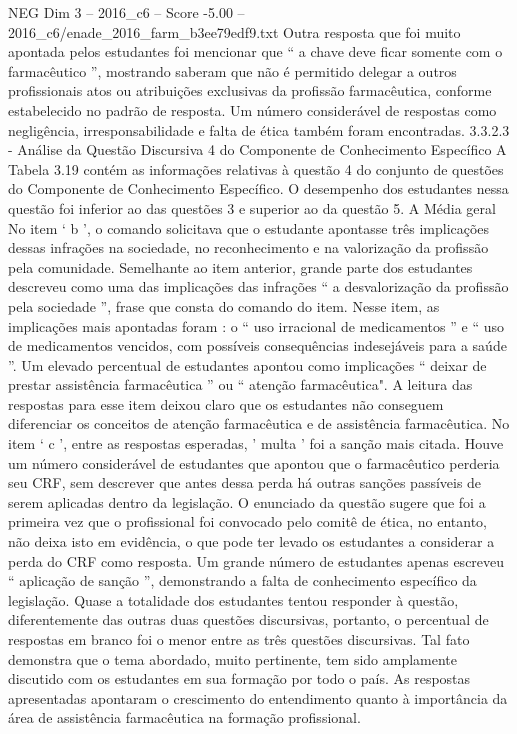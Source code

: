 \begin{textsample}{NEG Dim 3 – 2016\_c6 – Score -5.00 – 2016\_c6/enade\_2016\_farm\_b3ee79edf9.txt}
Outra resposta que foi muito apontada pelos estudantes foi mencionar que “ a chave deve ficar somente com o farmacêutico ”, mostrando saberam que não é permitido delegar a outros profissionais atos ou atribuições exclusivas da profissão farmacêutica, conforme estabelecido no padrão de resposta.
Um número considerável de respostas como negligência, irresponsabilidade e falta de ética também foram encontradas. 3.3.2.3 - Análise da Questão Discursiva 4 do Componente de Conhecimento Específico A Tabela 3.19 contém as informações relativas à questão 4 do conjunto de questões do Componente de Conhecimento Específico.
O desempenho dos estudantes nessa questão foi inferior ao das questões 3 e superior ao da questão 5.
A Média geral No item ‘ b ’, o comando solicitava que o estudante apontasse três implicações dessas infrações na sociedade, no reconhecimento e na valorização da profissão pela comunidade.
Semelhante ao item anterior, grande parte dos estudantes descreveu como uma das implicações das infrações “ a desvalorização da profissão pela sociedade ”, frase que consta do comando do item.
Nesse item, as implicações mais apontadas foram : o “ uso irracional de medicamentos ” e “ uso de medicamentos vencidos, com possíveis consequências indesejáveis para a saúde ”.
Um elevado percentual de estudantes apontou como implicações “ deixar de prestar assistência farmacêutica ” ou “ atenção farmacêutica".
A leitura das respostas para esse item deixou claro que os estudantes não conseguem diferenciar os conceitos de atenção farmacêutica e de assistência farmacêutica.
No item ‘ c ’, entre as respostas esperadas, ' multa ' foi a sanção mais citada.
Houve um número considerável de estudantes que apontou que o farmacêutico perderia seu CRF, sem descrever que antes dessa perda há outras sanções passíveis de serem aplicadas dentro da legislação.
O enunciado da questão sugere que foi a primeira vez que o profissional foi convocado pelo comitê de ética, no entanto, não deixa isto em evidência, o que pode ter levado os estudantes a considerar a perda do CRF como resposta.
Um grande número de estudantes apenas escreveu “ aplicação de sanção ”, demonstrando a falta de conhecimento específico da legislação.
Quase a totalidade dos estudantes tentou responder à questão, diferentemente das outras duas questões discursivas, portanto, o percentual de respostas em branco foi o menor entre as três questões discursivas.
Tal fato demonstra que o tema abordado, muito pertinente, tem sido amplamente discutido com os estudantes em sua formação por todo o país.
As respostas apresentadas apontaram o crescimento do entendimento quanto à importância da área de assistência farmacêutica na formação profissional.

\end{textsample}
